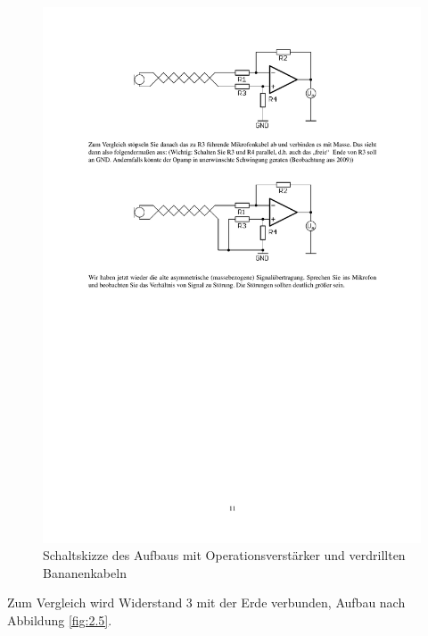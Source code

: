 \documentclass[12pt,a4paper]{article}
\begin{document}
\begin{figure}[H] 
  \centering
    \includegraphics[trim = 10mm 230mm 10mm 20mm, clip, scale = 1]{2_3+Op-Amp.pdf}
  	\caption[Schaltskizze des Aufbaus mit Operationsverstärker und verdrillten Bananenkabeln]{Schaltskizze des Aufbaus mit Operationsverstärker und verdrillten Bananenkabeln\footnotemark}
  \label{fig:2.4}
\end{figure}

Zum Vergleich wird Widerstand 3 mit der Erde verbunden, Aufbau nach Abbildung \ref{fig:2.5}.
\end{document}
